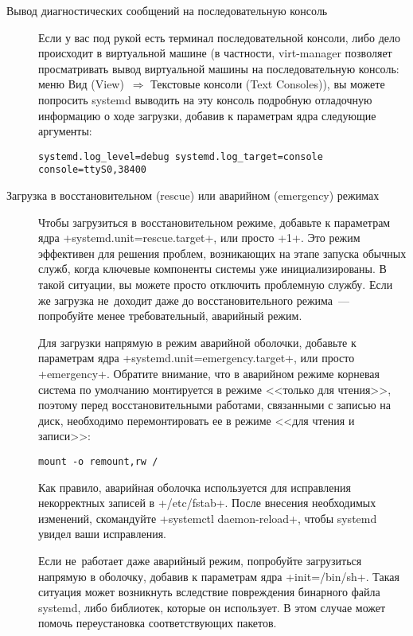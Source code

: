 \documentclass[10pt,oneside,a4paper]{article}
\begin{document}
\begin{description}
\item[Вывод диагностических сообщений на последовательную консоль]%
	\hypertarget{it:serial}{} Если у вас под рукой есть терминал
	последовательной консоли, либо дело происходит в виртуальной машине (в
	частности, virt-manager позволяет просматривать вывод виртуальной машины
	на последовательную консоль: меню Вид (View)~$\Rightarrow$ Текстовые
	консоли (Text Consoles)), вы можете попросить systemd выводить на эту
	консоль подробную отладочную информацию о ходе загрузки, добавив к
	параметрам ядра следующие аргументы:
\begin{Verbatim}
systemd.log_level=debug systemd.log_target=console console=ttyS0,38400
\end{Verbatim}

\item[Загрузка в восстановительном (rescue) или аварийном (emergency)
	режимах] Чтобы загрузиться в восстановительном режиме, добавьте к
	параметрам ядра +systemd.unit=rescue.target+, или просто +1+. Это режим
	эффективен для решения проблем, возникающих на этапе запуска обычных
	служб, когда ключевые компоненты системы уже инициализированы. В такой
	ситуации, вы можете просто отключить проблемную службу. Если же загрузка
	не~доходит даже до восстановительного режима~--- попробуйте менее
	требовательный, аварийный режим.

	Для загрузки напрямую в режим аварийной оболочки, добавьте к параметрам
	ядра +systemd.unit=emergency.target+, или просто +emergency+. Обратите
	внимание, что в аварийном режиме корневая система по умолчанию
	монтируется в режиме <<только для чтения>>, поэтому перед
	восстановительными работами, связанными с записью на диск, необходимо
	перемонтировать ее в режиме <<для чтения и записи>>:
\begin{Verbatim}
mount -o remount,rw /
\end{Verbatim}

	Как правило, аварийная оболочка используется для исправления
	некорректных записей в +/etc/fstab+. После внесения необходимых
	изменений, скомандуйте +systemctl daemon-reload+, чтобы systemd увидел
	ваши исправления.

	Если не~работает даже аварийный режим, попробуйте загрузиться напрямую в
	оболочку, добавив к параметрам ядра +init=/bin/sh+. Такая ситуация может
	возникнуть вследствие повреждения бинарного файла systemd, либо
	библиотек, которые он использует. В этом случае может помочь
	переустановка соответствующих пакетов.


\end{description}
\end{document}

